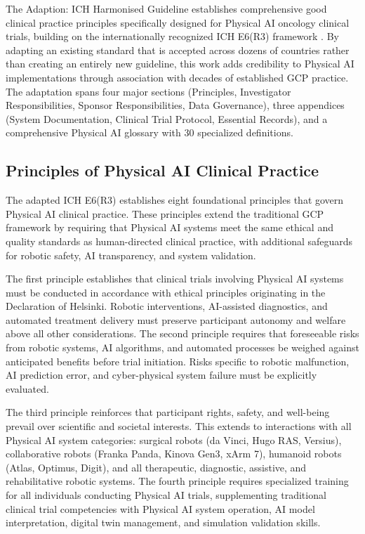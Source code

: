 
The Adaption: ICH Harmonised Guideline \cite{ich-adapt} establishes
comprehensive good clinical practice principles specifically designed for
Physical AI oncology clinical trials, building on the internationally recognized
ICH E6(R3) framework \cite{ich-e6r3}. By adapting an existing standard that is
accepted across dozens of countries rather than creating an entirely new
guideline, this work adds credibility to Physical AI implementations through
association with decades of established GCP practice. The adaptation spans four
major sections (Principles, Investigator Responsibilities, Sponsor
Responsibilities, Data Governance), three appendices (System Documentation,
Clinical Trial Protocol, Essential Records), and a comprehensive Physical AI
glossary with 30 specialized definitions.

\subsection{Principles of Physical AI Clinical Practice}
\label{subsec:ich-principles}

The adapted ICH E6(R3) establishes eight foundational principles that govern
Physical AI clinical practice. These principles extend the traditional GCP
framework by requiring that Physical AI systems meet the same ethical and
quality standards as human-directed clinical practice, with additional
safeguards for robotic safety, AI transparency, and system validation.

The first principle establishes that clinical trials involving Physical AI
systems must be conducted in accordance with ethical principles originating in
the Declaration of Helsinki. Robotic interventions, AI-assisted diagnostics,
and automated treatment delivery must preserve participant autonomy and welfare
above all other considerations. The second principle requires that foreseeable
risks from robotic systems, AI algorithms, and automated processes be weighed
against anticipated benefits before trial initiation. Risks specific to robotic
malfunction, AI prediction error, and cyber-physical system failure must be
explicitly evaluated.

The third principle reinforces that participant rights, safety, and well-being
prevail over scientific and societal interests. This extends to interactions
with all Physical AI system categories: surgical robots (da Vinci, Hugo RAS,
Versius), collaborative robots (Franka Panda, Kinova Gen3, xArm 7), humanoid
robots (Atlas, Optimus, Digit), and all therapeutic, diagnostic, assistive, and
rehabilitative robotic systems. The fourth principle requires specialized
training for all individuals conducting Physical AI trials, supplementing
traditional clinical trial competencies with Physical AI system operation, AI
model interpretation, digital twin management, and simulation validation skills.

